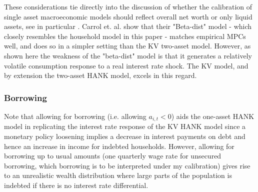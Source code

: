 These considerations tie directly into the discussion of whether the calibration of single asset macroeconomic models should reflect overall net worth or only liquid assets, see in particular \citet{carroll2017distribution}. Carrol et. al. show that their "Beta-dist" model - which closely resembles the household model in this paper - matches empirical MPCs well, and does so in a simpler setting than the KV two-asset model. However, as shown here the weakness of the "beta-dist" model is that it generates a relatively volatile consumption response to a real interest rate shock. The KV model, and by extension the two-asset HANK model, excels in this regard. 


\subsubsection{Borrowing} Note that allowing for borrowing (i.e. allowing $a_{i,t}<0$) aids the one-asset HANK model in replicating the interest rate response of the KV HANK model since a monetary policy loosening implies a decrease in interest payments on debt and hence an increase in income for indebted households.  However, allowing for borrowing up to usual amounts (one quarterly wage rate for unsecured borrowing, which borrowing is to be interpreted under my calibration) gives rise to an unrealistic wealth distribution where large parts of the population is indebted if there is no interest rate differential. 

